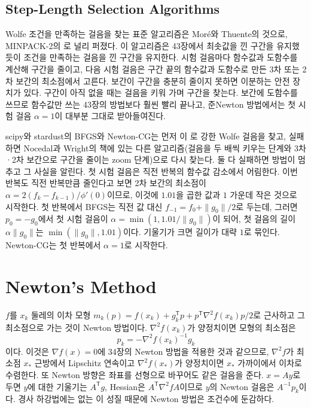 \subsection{Step-Length Selection Algorithms}

Wolfe 조건을 만족하는 걸음을 찾는 표준 알고리즘은 Moré와 Thuente의 것으로\cite{more1994linesearch}, MINPACK-2의 로 널리 퍼졌다. 이 알고리즘은 43장에서 최솟값을 낀 구간을 유지했듯이 조건을 만족하는 걸음을 낀 구간을 유지한다. 시험 걸음마다 함수값과 도함수를 계산해 구간을 줄이고, 다음 시험 걸음은 구간 끝의 함수값과 도함수로 만든 3차 또는 2차 보간의 최소점에서 고른다. 보간이 구간을 충분히 줄이지 못하면 이분하는 안전 장치가 있다. 구간이 아직 없을 때는 걸음을 키워 가며 구간을 찾는다. 보간에 도함수를 쓰므로 함수값만 쓰는 43장의 방법보다 훨씬 빨리 끝나고, 준Newton 방법에서는 첫 시험 걸음 $\alpha=1$이 대부분 그대로 받아들여진다.

scipy와 stardust의 BFGS와 Newton-CG는 먼저 이 로 강한 Wolfe 걸음을 찾고, 실패하면 Nocedal과 Wright의 책에 있는 다른 알고리즘(걸음을 두 배씩 키우는 단계와 3차·2차 보간으로 구간을 줄이는 zoom 단계)으로 다시 찾는다\cite{nocedal2006}. 둘 다 실패하면 방법이 멈추고 그 사실을 알린다. 첫 시험 걸음은 직전 반복의 함수값 감소에서 어림한다. 이번 반복도 직전 반복만큼 줄인다고 보면 2차 보간의 최소점이 $\alpha=2(f_k-f_{k-1})/\phi'(0)$이므로, 이것에 $1.01$을 곱한 값과 $1$ 가운데 작은 것으로 시작한다. 첫 반복에서 BFGS는 직전 값 대신 $f_{-1}=f_0+\|g_0\|/2$로 두는데, 그러면 $p_0=-g_0$에서 첫 시험 걸음이 $\alpha=\min(1,1.01/\|g_0\|)$이 되어, 첫 걸음의 길이 $\alpha\|g_0\|$는 $\min(\|g_0\|,1.01)$이다. 기울기가 크면 길이가 대략 $1$로 묶인다. Newton-CG는 첫 반복에서 $\alpha=1$로 시작한다.

\section{Newton's Method}
\label{sec:newton-min}

$f$를 $x_k$ 둘레의 이차 모형 $m_k(p)=f(x_k)+g_k^{\mathsf T}p+p^{\mathsf T}\nabla^2f(x_k)p/2$로 근사하고 그 최소점으로 가는 것이 Newton 방법이다. $\nabla^2f(x_k)$가 양정치이면 모형의 최소점은
\[
p_k=-\nabla^2f(x_k)^{-1}g_k
\]
이다. 이것은 $\nabla f(x)=0$에 34장의 Newton 방법을 적용한 것과 같으므로, $\nabla^2f$가 최소점 $x_\ast$ 근방에서 Lipschitz 연속이고 $\nabla^2f(x_\ast)$가 양정치이면 $x_\ast$ 가까이에서 이차로 수렴한다. 또 Newton 방향은 좌표를 선형으로 바꾸어도 같은 걸음을 준다. $x=Ay$로 두면 $y$에 대한 기울기는 $A^{\mathsf T}g$, Hessian은 $A^{\mathsf T}\nabla^2fA$이므로 $y$의 Newton 걸음은 $A^{-1}p_k$이다. 경사 하강법에는 없는 이 성질 때문에 Newton 방법은 조건수에 둔감하다.

